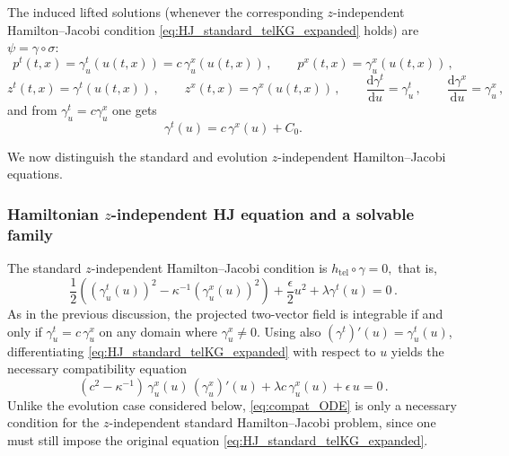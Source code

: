 \documentclass[11pt,twoside]{article}
\theoremstyle{plain}
\theoremstyle{definition}
\theoremstyle{remark}
\renewcommand{\d}{\mathrm{d}}
\begin{document}
The induced lifted solutions (whenever the corresponding $z$-independent Hamilton--Jacobi condition \eqref{eq:HJ_standard_telKG_expanded} holds) are $\psi=\gamma\circ\sigma$:
\[
p^t(t,x)=\gamma_u^t(u(t,x))=c\,\gamma_u^x(u(t,x))\,,\qquad
p^x(t,x)=\gamma_u^x(u(t,x))\,,
\]
\[
    z^t(t,x)=\gamma^t(u(t,x))\,,\qquad z^x(t,x)=\gamma^x(u(t,x))\,,
    \qquad \frac{\d\gamma^t}{\d u}=\gamma_u^t\,,\qquad\frac{\d\gamma^x}{\d u}=\gamma_u^x\,,
\]
and from $\gamma_u^t=c\gamma_u^x$ one gets \begin{equation}\label{ConditionGammaTX}
\gamma^t(u)=c\,\gamma^x(u)+C_0.
\end{equation}

We now distinguish the standard and evolution \(z\)-independent Hamilton--Jacobi equations.



\subsubsection{Hamiltonian  \texorpdfstring{$z$}{}-independent HJ equation and a solvable family}

The standard $z$-independent Hamilton--Jacobi condition is
$
h_{\mathrm{tel}}\circ\gamma=0,
$
that is,
\begin{equation}\label{eq:HJ_standard_telKG_expanded}
\frac12\left((\gamma_u^t(u))^2-\kappa^{-1}(\gamma_u^x(u))^2\right)
+\frac{\epsilon}{2}u^2+\lambda \gamma^t(u)=0\,.
\end{equation}
As in the previous discussion, the projected two-vector field is integrable if and only if
\(
\gamma_u^t=c\,\gamma_u^x
\) 
on any domain where $\gamma_u^x\neq0$. Using also $(\gamma^t)'(u)=\gamma_u^t(u)$, differentiating \eqref{eq:HJ_standard_telKG_expanded} with respect to \(u\) yields the necessary compatibility equation
\begin{equation}\label{eq:compat_ODE}
(c^2-\kappa^{-1})\,\gamma_u^x(u)\,(\gamma_u^x)'(u)+\lambda c\,\gamma_u^x(u)+\epsilon\,u=0\,.
\end{equation}
Unlike the evolution case considered below, \eqref{eq:compat_ODE} is only a necessary condition for the $z$-independent standard Hamilton--Jacobi problem, since one must still impose the original equation \eqref{eq:HJ_standard_telKG_expanded}.
\end{document}
